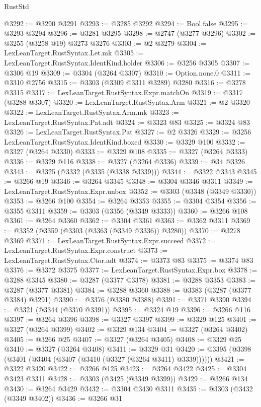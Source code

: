 \begin{lexlean}{RustStd}
\begin{coremodule}
@3292 := @3290 @3291
@3293 := @3285 @3292
@3294 := Bool.false
@3295 := @3293 @3294
@3296 := @3281 @3295
@3298 := @2747 (@3277 @3296)
@3302 := @3255 (@3258 @19) @3273 @3276
@3303 := @2 @3279
@3304 := LexLeanTarget.RustSyntax.Let.mk
@3305 := LexLeanTarget.RustSyntax.IdentKind.holder
@3306 := @3256 @3305
@3307 := @3306 @19
@3309 := @3304 (@3264 @3307)
@3310 := Option.none.{0}
@3311 := @3310 @2756
@3315 := @3303 (@3309 @3311 @3289) @3280
@3316 := @3278 @3315
@3317 := LexLeanTarget.RustSyntax.Expr.matchOn
@3319 := @3317 (@3288 @3307)
@3320 := LexLeanTarget.RustSyntax.Arm
@3321 := @2 @3320
@3322 := LexLeanTarget.RustSyntax.Arm.mk
@3323 := LexLeanTarget.RustSyntax.Pat.adt
@3324 := @3323 @83
@3325 := @3324 @83
@3326 := LexLeanTarget.RustSyntax.Pat
@3327 := @2 @3326
@3329 := @3256 LexLeanTarget.RustSyntax.IdentKind.boxed
@3330 := @3329 @100
@3332 := @3327 (@3264 @3330)
@3333 := @3329 @108
@3335 := @3327 (@3264 @3333)
@3336 := @3329 @116
@3338 := @3327 (@3264 @3336)
@3339 := @34 @3326
@3343 := @3325 (@3332 (@3335 (@3338 @3339)))
@3344 := @3322 @3343
@3345 := @3266 @19
@3346 := @3264 @3345
@3348 := @3304 @3346 @3311
@3349 := LexLeanTarget.RustSyntax.Expr.unbox
@3352 := @3303 (@3348 (@3349 @3330))
@3353 := @3266 @100
@3354 := @3264 @3353
@3355 := @3304 @3354
@3356 := @3355 @3311
@3359 := @3303 (@3356 (@3349 @3333))
@3360 := @3266 @108
@3361 := @3264 @3360
@3362 := @3304 @3361
@3363 := @3362 @3311
@3369 := @3352 (@3359 (@3303 (@3363 (@3349 @3336)) @3280))
@3370 := @3278 @3369
@3371 := LexLeanTarget.RustSyntax.Expr.succeed
@3372 := LexLeanTarget.RustSyntax.Expr.construct
@3373 := LexLeanTarget.RustSyntax.Ctor.adt
@3374 := @3373 @83
@3375 := @3374 @83
@3376 := @3372 @3375
@3377 := LexLeanTarget.RustSyntax.Expr.box
@3378 := @3288 @3345
@3380 := @3287 (@3377 @3378)
@3381 := @3288 @3353
@3383 := @3287 (@3377 @3381)
@3384 := @3288 @3360
@3388 := @3383 (@3287 (@3377 @3384) @3291)
@3390 := @3376 (@3380 @3388)
@3391 := @3371 @3390
@3394 := @3321 (@3344 (@3370 @3391))
@3395 := @3324 @19
@3396 := @3266 @116
@3397 := @3264 @3396
@3398 := @3327 @3397
@3399 := @3329 @125
@3401 := @3327 (@3264 @3399)
@3402 := @3329 @134
@3404 := @3327 (@3264 @3402)
@3405 := @3266 @25
@3407 := @3327 (@3264 @3405)
@3408 := @3329 @25
@3410 := @3327 (@3264 @3408)
@3411 := @3329 @31
@3420 := @3395 (@3398 (@3401 (@3404 (@3407 (@3410 (@3327 (@3264 @3411) @3339))))))
@3421 := @3322 @3420
@3422 := @3266 @125
@3423 := @3264 @3422
@3425 := @3304 @3423 @3311
@3428 := @3303 (@3425 (@3349 @3399))
@3429 := @3266 @134
@3430 := @3264 @3429
@3432 := @3304 @3430 @3311
@3435 := @3303 (@3432 (@3349 @3402))
@3436 := @3266 @31

\end{coremodule}
\end{lexlean}
